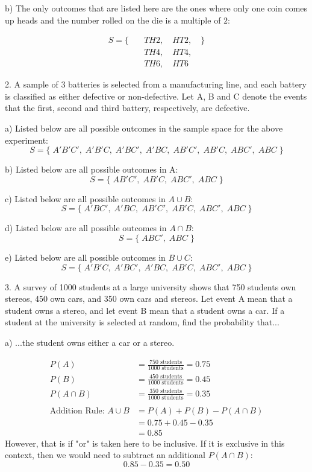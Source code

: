 \documentclass[12pt, letterpaper]{article}
\begin{document}
\qquad b) The only outcomes that are listed here are the ones where only one coin comes up heads and the number rolled on the die is a multiple of $2$:
\begin{center}
	\begin{align*}
		S = \{\quad &TH2,\quad HT2, \quad\} \\
			   		&TH4,\quad HT4,		  \\
			   		&TH6,\quad HT6
	\end{align*}
\end{center}

2. A sample of 3 batteries is selected from a manufacturing line, and each battery is classified as either defective or non-defective.  Let A, B and C denote the events that the first, second and third battery, respectively, are defective.

\qquad a) Listed below are all possible outcomes in the sample space for the above experiment:
$$S = \{\;A'B'C',\;A'B'C,\;A'BC',\;A'BC,\;AB'C',\;AB'C,\;ABC',\;ABC\;\}$$

\qquad b) Listed below are all possible outcomes in A:
$$S = \{\;AB'C',\;AB'C,\;ABC',\;ABC\;\}$$

\pagebreak

\qquad c) Listed below are all possible outcomes in $A \cup B$:
$$S = \{\;A'BC',\;A'BC,\;AB'C',\;AB'C,\;ABC',\;ABC\;\}$$

\qquad d) Listed below are all possible outcomes in $A \cap B$:
$$S = \{\;ABC',\;ABC\;\}$$

\qquad e) Listed below are all possible outcomes in $B \cup C$:
$$S = \{\;A'B'C,\;A'BC',\;A'BC,\;AB'C,\;ABC',\;ABC\;\}$$

3. A survey of 1000 students at a large university shows that 750 students own stereos, 450 own cars, and 350 own cars and stereos. Let event A mean that a student owns a stereo, and let event B mean that a student owns a car. If a student at the university is selected at random, find the probability that...

\qquad a) ...the student owns either a car or a stereo.
\begin{center}
	\begin{align*}
		P(A) &= \frac{750 \text{ students}}{1000 \text{ students}} = 0.75 \\
		P(B) &= \frac{450 \text{ students}}{1000 \text{ students}} = 0.45 \\
		P(A \cap B) &= \frac{350 \text{ students}}{1000 \text{ students}} = 0.35 \\
		\\
		\text{Addition Rule: } A \cup B &= P(A) + P(B) - P(A \cap B) \\
		&= 0.75 + 0.45 - 0.35 \\
		&= \boxed{0.85}
	\end{align*}
	However, that is if "or" is taken here to be inclusive. If it is exclusive in this context, then we would need to subtract an additional $P(A \cap B)$:
	$$0.85-0.35=\boxed{0.50}$$
\end{center}
\end{document}
